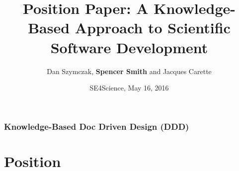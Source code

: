 \documentclass{beamer}
\title[\pgfuseimage{logo}] %
{Position Paper: A Knowledge-Based Approach to Scientific Software Development}
\author[Slide \thepage~of \pageref{TotPages}] %
{Dan Szymczak, \textbf{Spencer Smith} and Jacques Carette}
\institute[McMaster University] %
{
  Computing and Software Department\\
  Faculty of Engineering\\
  McMaster University
}
\date[Jan 12, 2016] %
{SE4Science, May 16, 2016}
\begin{document}
\begin{frame}

\titlepage

\end{frame}


\begin{frame}

\frametitle{Knowledge-Based Doc Driven Design (DDD)}
\tableofcontents


\end{frame}


\section[Position]{Position}


\end{document}
